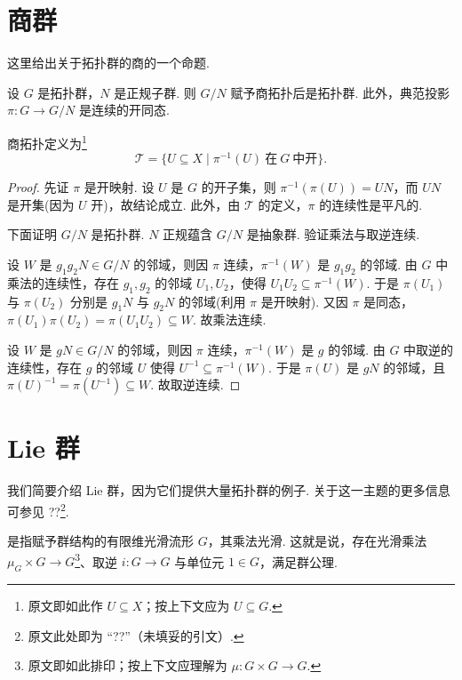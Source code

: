 \section{商群}

这里给出关于拓扑群的商的一个命题.

\begin{proposition}\label{c1-prop-5-1}
设 $G$ 是拓扑群，$N$ 是正规子群. 则 $G/N$ 赋予商拓扑后是拓扑群. 此外，典范投影 $\pi:G\to G/N$ 是连续的开同态.
\end{proposition}

\begin{remark}\label{c1-rem-5-1}
商拓扑定义为\footnote{原文即如此作 $U\subseteq X$；按上下文应为 $U\subseteq G$.}
\[
\mathcal{T}=\{U\subseteq X\mid \pi^{-1}(U)\ \text{在}\ G\ \text{中开}\}.
\]
\end{remark}

\begin{proof}
先证 $\pi$ 是开映射. 设 $U$ 是 $G$ 的开子集，则 $\pi^{-1}(\pi(U))=UN$，而 $UN$ 是开集(因为 $U$ 开)，故结论成立. 此外，由 $\mathcal{T}$ 的定义，$\pi$ 的连续性是平凡的.

下面证明 $G/N$ 是拓扑群. $N$ 正规蕴含 $G/N$ 是抽象群. 验证乘法与取逆连续.

设 $W$ 是 $g_{1}g_{2}N\in G/N$ 的邻域，则因 $\pi$ 连续，$\pi^{-1}(W)$ 是 $g_{1}g_{2}$ 的邻域. 由 $G$ 中乘法的连续性，存在 $g_{1},g_{2}$ 的邻域 $U_{1},U_{2}$，使得 $U_{1}U_{2}\subseteq\pi^{-1}(W)$. 于是 $\pi(U_{1})$ 与 $\pi(U_{2})$ 分别是 $g_{1}N$ 与 $g_{2}N$ 的邻域(利用 $\pi$ 是开映射). 又因 $\pi$ 是同态，$\pi(U_{1})\pi(U_{2})=\pi(U_{1}U_{2})\subseteq W$. 故乘法连续.

设 $W$ 是 $gN\in G/N$ 的邻域，则因 $\pi$ 连续，$\pi^{-1}(W)$ 是 $g$ 的邻域. 由 $G$ 中取逆的连续性，存在 $g$ 的邻域 $U$ 使得 $U^{-1}\subseteq\pi^{-1}(W)$. 于是 $\pi(U)$ 是 $gN$ 的邻域，且 $\pi(U)^{-1}=\pi(U^{-1})\subseteq W$. 故取逆连续.
\end{proof}

\section{Lie 群}

我们简要介绍 Lie 群，因为它们提供大量拓扑群的例子. 关于这一主题的更多信息可参见 ??\footnote{原文此处即为 ``??''（未填妥的引文）.}.

\begin{definition}\label{c1-def-6-1}
 是指赋予群结构的有限维光滑流形 $G$，其乘法光滑. 这就是说，存在光滑乘法 $\mu_{G}\times G\to G$\footnote{原文即如此排印；按上下文应理解为 $\mu:G\times G\to G$.}、取逆 $i:G\to G$ 与单位元 $1\in G$，满足群公理.
\end{definition}

